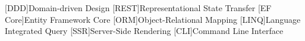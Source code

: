 [DDD]{Domain-driven Design}
[REST]{Representational State Transfer}
[EF Core]{Entity Framework Core}
[ORM]{Object-Relational Mapping}
[LINQ]{Language Integrated Query}
[SSR]{Server-Side Rendering}
[CLI]{Command Line Interface}

